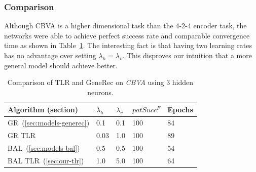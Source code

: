 \subsubsection{Comparison} 
\label{sec:results-cmp-k3} 
Although CBVA is a higher dimensional task than the 4-2-4 encoder task, the networks were able to achieve perfect success rate and comparable convergence time as shown in Table~\ref{tab:results-cmp-k3}. The interesting fact is that having two learning rates has no advantage over setting $\lambda_h = \lambda_v$. This disproves our intuition that a more general model should achieve better. 


\begin{table}[H] 
  \centering
    \begin{tabular}{|l|l|l|l|l|}
    \hline
    Algorithm (section)&$\lambda_h$&$\lambda_v$&$patSucc^F$ &Epochs\\ %
    \hline
    GR~(\ref{sec:models-generec}) & 0.1 & 0.1 & 100 & 84\\ %
    \hline
    GR TLR &0.03 & 1.0 & 100 & 89\\ %
    \hline
    BAL~(\ref{sec:models-bal})&0.5& 0.5&100& 54\\ %
    \hline
    BAL TLR~(\ref{sec:our-tlr})&1.0& 5.0 & 100& 64\\ %
    \hline 
    \end{tabular}
  \caption{Comparison of TLR and GeneRec on \emph{CBVA} using 3 hidden neurons.} 
  \label{tab:results-cmp-k3}
\end{table}




